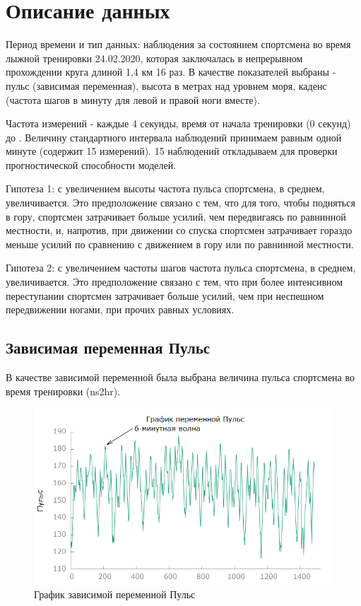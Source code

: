 \documentclass[a4paper,12pt]{article}
\begin{document}

\tableofcontents
\pagebreak

\section{Описание данных}
Период времени и тип данных: наблюдения за состоянием спортсмена во время лыжной тренировки 24.02.2020, которая заключалась в непрерывном прохождении круга длиной 1,4 км 16 раз. В качестве показателей выбраны - пульс (зависимая переменная), высота в метрах над уровнем моря, каденс (частота шагов в минуту для левой и правой ноги вместе).

Частота измерений - каждые 4 секунды, время от начала тренировки (0 секунд) до . Величину стандартного интервала наблюдений принимаем равным одной минуте (содержит 15 измерений). 15 наблюдений откладываем для проверки прогностической способности моделей.

Гипотеза 1: с увеличением высоты частота пульса спортсмена, в среднем, увеличивается. Это предположение связано с тем, что для того, чтобы подняться в гору, спортсмен затрачивает больше усилий, чем передвигаясь по равнинной местности, и, напротив, при движении со спуска спортсмен затрачивает гораздо меньше усилий по сравнению с движением в гору или по равнинной местности.

Гипотеза 2: с увеличением частоты шагов частота пульса спортсмена, в среднем, увеличивается. Это предположение связано с тем, что при более интенсивном переступании спортсмен затрачивает больше усилий, чем при неспешном передвижении ногами, при прочих равных условиях.

\subsection{Зависимая переменная Пульс}

В качестве зависимой переменной была выбрана величина пульса спортсмена во время тренировки (ns2hr).

\begin{figure}[H]
	\centering
	\includegraphics[width=0.5\linewidth]{../[graphics]/hr_graph}
	\caption{График зависимой переменной Пульс}
	\label{fig:hr_graph}
\end{figure}
\end{document}
